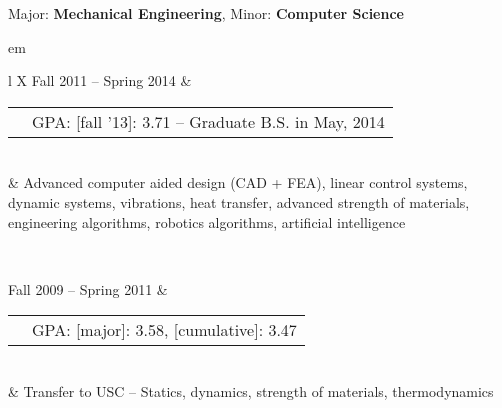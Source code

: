 

{\centering \large{Major: \textbf{Mechanical Engineering}, Minor: \textbf{Computer Science}} \par }

	
{ em
\begin{tabu}{ L{\tabularIndent} X } \hhline{==}
	Fall 2011 -- Spring 2014 & 
	\begin{tabular}{ l | l }
		\mysubsection{University of Southern California} & GPA: [fall '13]: 3.71 -- Graduate B.S. in May, 2014 \\ \cline{1-1}
	\end{tabular}
	\\
	&
	Advanced computer aided design (CAD + FEA), linear control systems, dynamic systems, vibrations, heat transfer, advanced strength of materials, engineering algorithms, robotics algorithms, artificial intelligence

\\ \hhline{==}

	Fall 2009 -- Spring 2011 & 
	\begin{tabular}{ l | l }
		\mysubsection{University of Massachusetts, Amherst} & GPA: [major]: 3.58, [cumulative]: 3.47 \\ \cline{1-1}
	\end{tabular}
	\\
	& Transfer to USC -- Statics, dynamics, strength of materials, thermodynamics
\end{tabu}}